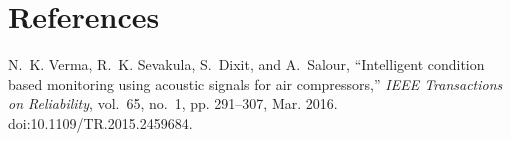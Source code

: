 \documentclass[12pt,a4paper]{article}
\begin{document}

\section*{References}
\begin{thebibliography}{1}
N.~K. Verma, R.~K. Sevakula, S.~Dixit, and A.~Salour, ``Intelligent condition based monitoring using acoustic signals for air compressors,'' \emph{IEEE Transactions on Reliability}, vol.~65, no.~1, pp. 291--307, Mar. 2016. doi:10.1109/TR.2015.2459684.
\end{thebibliography}
\end{document}
